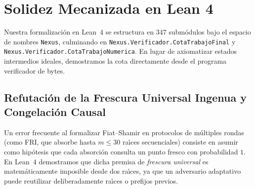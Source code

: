 \documentclass[conference]{IEEEtran}
\theoremstyle{definition}
\begin{document}
\section{Solidez Mecanizada en Lean 4}
\label{sec:lean}

Nuestra formalizaci\'{o}n en Lean~4 se estructura en $347$ subm\'{o}dulos bajo el espacio de nombres \texttt{Nexus}, culminando en \texttt{Nexus.Verificador.CotaTrabajoFinal} y \texttt{Nexus.Verificador.CotaTrabajoNumerica}. En lugar de axiomatizar estados intermedios ideales, demostramos la cota directamente desde el programa verificador de bytes.

\subsection{Refutaci\'{o}n de la Frescura Universal Ingenua y Congelaci\'{o}n Causal}
Un error frecuente al formalizar Fiat--Shamir en protocolos de m\'{u}ltiples rondas (como FRI, que absorbe hasta $m \le 30$ ra\'{\i}ces secuenciales) consiste en asumir como hip\'{o}tesis que cada absorci\'{o}n consulta un punto fresco con probabilidad $1$. En Lean~4 demostramos que dicha premisa de \emph{frescura universal} es matem\'{a}ticamente imposible desde dos ra\'{\i}ces, ya que un adversario adaptativo puede reutilizar deliberadamente ra\'{\i}ces o prefijos previos.
\end{document}
